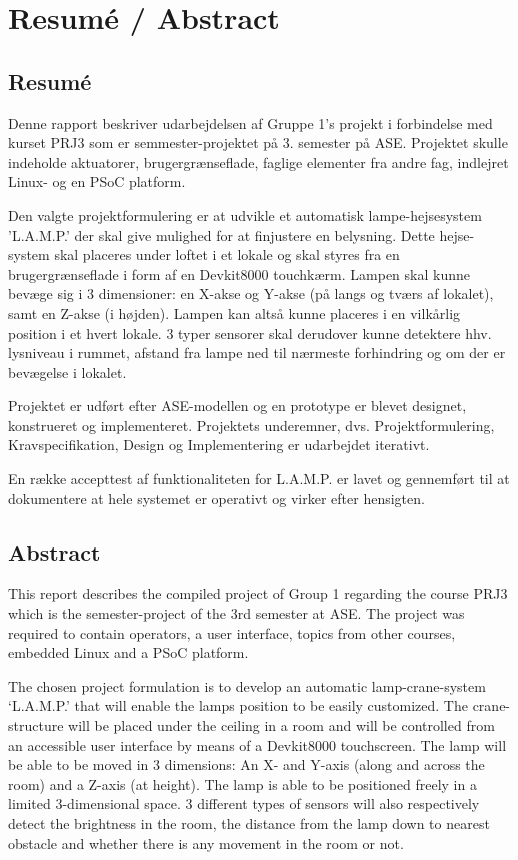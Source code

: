 \chapter*{Resumé / Abstract}

\section{Resumé}

Denne rapport beskriver udarbejdelsen af Gruppe 1’s projekt i forbindelse med kurset PRJ3 som er semmester-projektet på 3. semester på ASE. Projektet skulle indeholde aktuatorer, brugergrænseflade, faglige elementer fra andre fag, indlejret Linux- og en PSoC platform.

Den valgte projektformulering er at udvikle et automatisk lampe-hejsesystem ’L.A.M.P.’ der skal give mulighed for at finjustere en belysning. Dette hejse-system skal placeres under loftet i et lokale og skal styres fra en brugergrænseflade i form af en Devkit8000 touchkærm. Lampen skal kunne bevæge sig i 3 dimensioner: en X-akse og Y-akse (på langs og tværs af lokalet), samt en Z-akse (i højden). Lampen kan altså kunne placeres i en vilkårlig position i et hvert lokale. 3 typer sensorer skal derudover kunne detektere hhv. lysniveau i rummet, afstand fra lampe ned til nærmeste forhindring og om der er bevægelse i lokalet. 

Projektet er udført efter ASE-modellen og en prototype er blevet designet, konstrueret og implementeret. Projektets underemner, dvs. Projektformulering, Kravspecifikation, Design og Implementering er udarbejdet iterativt.

En række accepttest af funktionaliteten for L.A.M.P. er lavet og gennemført til at dokumentere at hele systemet er operativt og virker efter hensigten.

\section{Abstract}

This report describes the compiled project of Group 1 regarding the course PRJ3 which is the semester-project of the 3rd semester at ASE. The project was required to contain operators, a user interface, topics from other courses, embedded Linux and a PSoC platform.

The chosen project formulation is to develop an automatic lamp-crane-system ‘L.A.M.P.’ that will enable the lamps position to be easily customized. The crane-structure will be placed under the ceiling in a room and will be controlled from an accessible user interface by means of a Devkit8000 touchscreen. The lamp will be able to be moved in 3 dimensions: An X- and Y-axis (along and across the room) and a Z-axis (at height). The lamp is able to be positioned freely in a limited 3-dimensional space. 3 different types of sensors will also respectively detect the brightness in the room, the distance from the lamp down to nearest obstacle and whether there is any movement in the room or not.

